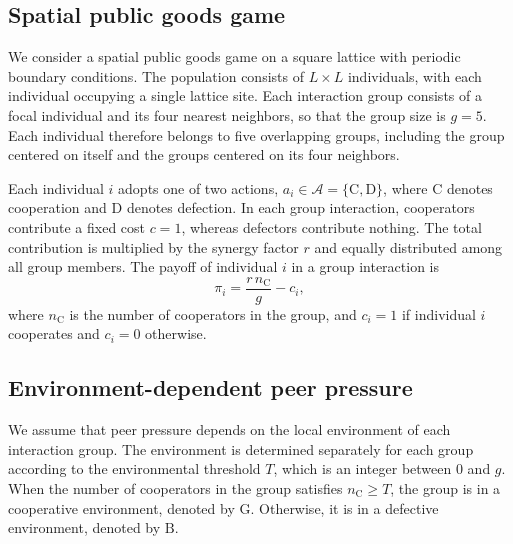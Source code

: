 \documentclass[%
  aip,cha,
  amsmath,amssymb,
  reprint,
  floatfix,
  article-title,
]{revtex4-2}
\begin{document}
\subsection{Spatial public goods game}\label{sec:pgg}

We consider a spatial public goods game on a square lattice with periodic boundary conditions. The population consists of $L\times L$ individuals, with each individual occupying a single lattice site. Each interaction group consists of a focal individual and its four nearest neighbors, so that the group size is $g=5$. Each individual therefore belongs to five overlapping groups, including the group centered on itself and the groups centered on its four neighbors.

Each individual $i$ adopts one of two actions, $a_i\in\mathcal{A}=\{\mathrm{C},\mathrm{D}\}$, where $\mathrm{C}$ denotes cooperation and $\mathrm{D}$ denotes defection. In each group interaction, cooperators contribute a fixed cost $c=1$, whereas defectors contribute nothing. The total contribution is multiplied by the synergy factor $r$ and equally distributed among all group members. The payoff of individual $i$ in a group interaction is
\begin{equation}
\pi_i=\frac{r\,n_{\mathrm{C}}}{g}-c_i,
\label{eq:payoff}
\end{equation}
where $n_{\mathrm{C}}$ is the number of cooperators in the group, and $c_i=1$ if individual $i$ cooperates and $c_i=0$ otherwise.

\subsection{Environment-dependent peer pressure}\label{sec:pressure}

We assume that peer pressure depends on the local environment of each interaction group. The environment is determined separately for each group according to the environmental threshold $T$, which is an integer between $0$ and $g$. When the number of cooperators in the group satisfies $n_{\mathrm{C}}\geq T$, the group is in a cooperative environment, denoted by $\mathrm{G}$. Otherwise, it is in a defective environment, denoted by $\mathrm{B}$.
\end{document}
